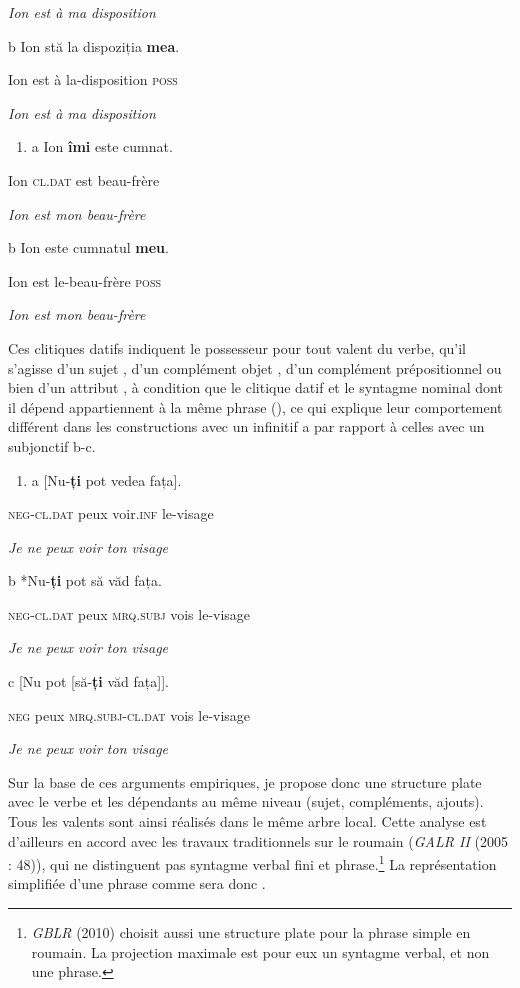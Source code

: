 \textit{  Ion est à ma disposition}  

  b  Ion  stă  la  dispoziția  \textbf{mea}.

    Ion  est  à  la-disposition  \textsc{poss}

    \textit{Ion est à ma disposition}


\begin{enumerate}
\item \label{bkm:Ref307435270}a  Ion  \textbf{îmi}  este  cumnat. 


\end{enumerate}
Ion\textsc{  cl.dat } est  beau-frère

\textit{  Ion est mon beau-frère}  

  b  Ion  este  cumnatul  \textbf{meu}.

    Ion  est  le-beau-frère  \textsc{poss}

    \textit{Ion est mon beau-frère}

Ces clitiques datifs indiquent le possesseur pour tout valent du verbe, qu'il s'agisse d'un sujet , d'un complément objet , d'un complément prépositionnel  ou bien d'un attribut , à condition que le clitique datif et le syntagme nominal dont il dépend appartiennent à la même phrase (\citet{Steriade1980}), ce qui explique leur comportement différent dans les constructions avec un infinitif a par rapport à celles avec un subjonctif b-c.


\begin{enumerate}
\item \label{bkm:Ref307435457}a  [Nu-\textbf{ți}  pot  vedea  fața]. 


\end{enumerate}
\textsc{  neg-cl.dat}  peux  voir\textsc{.inf}  le-visage

\textit{  Je ne peux voir ton visage}  

  b  *Nu-\textbf{ți}  pot  să  văd  fața.

    \textsc{neg-cl.dat}  peux  \textsc{mrq.subj } vois le-visage

    \textit{Je ne peux voir ton visage}

  c  [Nu  pot  [să-\textbf{ți}  văd  fața]]. 

    \textsc{neg } peux  \textsc{mrq.subj-cl.dat } vois  le-visage

    \textit{Je ne peux voir ton visage}

Sur la base de ces arguments empiriques, je propose donc une structure plate avec le verbe et les dépendants au même niveau (sujet, compléments, ajouts). Tous les valents sont ainsi réalisés dans le même arbre local. Cette analyse est d'ailleurs en accord avec les travaux traditionnels sur le roumain (\textit{GALR II} (2005 : 48)), qui ne distinguent pas syntagme verbal fini et phrase.\footnote{\textit{GBLR} (2010) choisit aussi une structure plate pour la phrase simple en roumain. La projection maximale est pour eux un syntagme verbal, et non une phrase.} La représentation simplifiée d'une phrase comme  sera donc .


